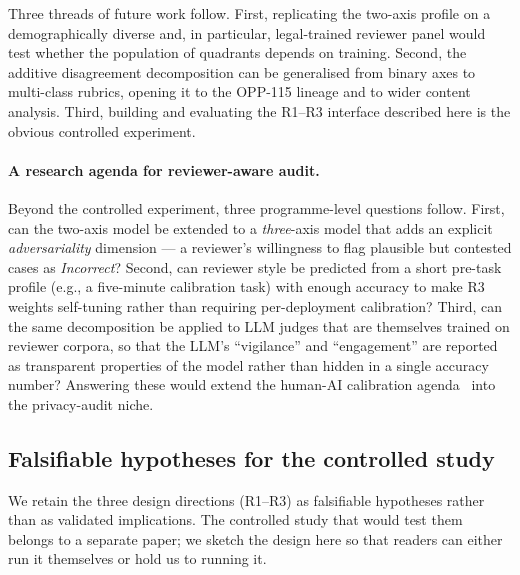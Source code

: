 \documentclass[11pt,a4paper]{article}
\begin{document}
Three threads of future work follow. First, replicating the
two-axis profile on a demographically diverse and, in particular,
legal-trained reviewer panel would test whether the population of
quadrants depends on training. Second, the additive disagreement
decomposition can be generalised from binary axes to multi-class
rubrics, opening it to the OPP-115 lineage and to wider content
analysis. Third, building and evaluating the R1--R3 interface
described here is the obvious controlled experiment.

\paragraph{A research agenda for reviewer-aware audit.}
Beyond the controlled experiment, three programme-level questions
follow. First, can the two-axis model be extended to a
\emph{three}-axis model that adds an explicit \emph{adversariality}
dimension --- a reviewer's willingness to flag plausible but
contested cases as \emph{Incorrect}? Second, can reviewer style be
predicted from a short pre-task profile (e.g., a five-minute
calibration task) with enough accuracy to make R3 weights
self-tuning rather than requiring per-deployment calibration?
Third, can the same decomposition be applied to LLM judges that are
themselves trained on reviewer corpora, so that the LLM's
``vigilance'' and ``engagement'' are reported as transparent
properties of the model rather than hidden in a single accuracy
number? Answering these would extend the human-AI calibration
agenda~\citep{cai2019hello,amershi2019guidelines,liao2020questioning}
into the privacy-audit niche.

\subsection*{Falsifiable hypotheses for the controlled study}

We retain the three design directions (R1--R3) as falsifiable
hypotheses rather than as validated implications. The controlled
study that would test them belongs to a separate paper; we sketch
the design here so that readers can either run it themselves or
hold us to running it.
\end{document}
